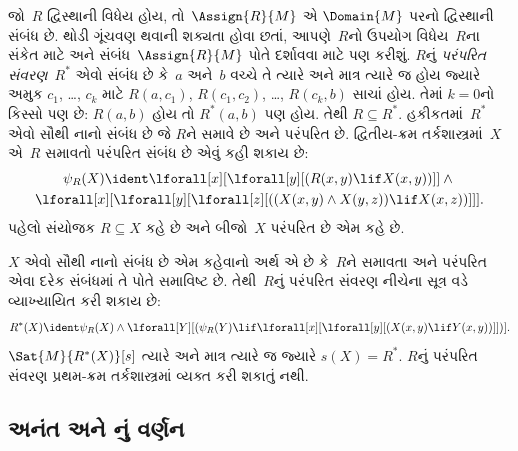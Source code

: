 \begin{ex}
જો~$R$ દ્વિસ્થાની વિધેય હોય, તો~$\Assign{R}{M}$ એ
$\Domain{M}$ પરનો દ્વિસ્થાની સંબંધ છે. થોડી ગૂંચવણ થવાની શક્યતા
હોવા છતાં, આપણે~$R$નો ઉપયોગ વિધેય~$R$ના સંકેત માટે અને
સંબંધ~$\Assign{R}{M}$ પોતે દર્શાવવા માટે પણ કરીશું. $R$નું
\emph{પરંપરિત સંવરણ}~$R^*$ એવો સંબંધ છે કે~$a$ અને~$b$ વચ્ચે તે
ત્યારે અને માત્ર ત્યારે જ હોય જ્યારે અમુક $c_1$, \dots, $c_k$
માટે $R(a,c_1)$, $R(c_1, c_2)$, \dots, $R(c_k,b)$ સાચાં હોય.
તેમાં $k = 0$નો કિસ્સો પણ છે: $R(a,b)$ હોય તો $R^*(a,b)$ પણ હોય.
તેથી $R \subseteq R^*$. હકીકતમાં~$R^*$ એવો સૌથી નાનો સંબંધ છે જે
$R$ને સમાવે છે અને પરંપરિત છે. દ્વિતીય-ક્રમ તર્કશાસ્ત્રમાં~$X$ એ~$R$
સમાવતો પરંપરિત સંબંધ છે એવું કહી શકાય છે:
\begin{multline*}
  \psi_R(X) \ident \lforall[x][\lforall[y][(R(x,y) \lif X(x, y))]] \land {}\\
\lforall[x][\lforall[y][\lforall[z][((X(x,y) \land X(y,z)) \lif X(x,
      z))]]].
\end{multline*}
પહેલો સંયોજક $R \subseteq X$ કહે છે અને બીજો~$X$ પરંપરિત છે એમ કહે
છે.

$X$ એવો સૌથી નાનો સંબંધ છે એમ કહેવાનો અર્થ એ છે કે~$R$ને સમાવતા
અને પરંપરિત એવા દરેક સંબંધમાં તે પોતે સમાવિષ્ટ છે. તેથી~$R$નું
પરંપરિત સંવરણ નીચેના સૂત્ર વડે વ્યાખ્યાયિત કરી શકાય છે:
\[
R^*(X) \ident \psi_R(X) \land \lforall[Y][(\psi_R(Y) \lif
  \lforall[x][\lforall[y][(X(x, y) \lif Y(x,y))]])].
\]
$\Sat{M}{R^*(X)}[s]$ ત્યારે અને માત્ર ત્યારે જ જ્યારે $s(X) = R^*$.
$R$નું પરંપરિત સંવરણ પ્રથમ-ક્રમ તર્કશાસ્ત્રમાં વ્યક્ત કરી શકાતું નથી.
\end{ex}





\subsection{અનંત અને 
  નું વર્ણન}\label{sol:syn:siz:sec}

